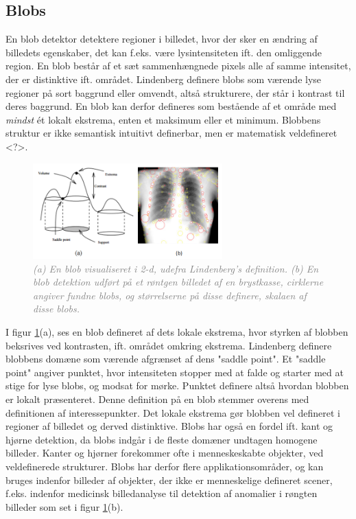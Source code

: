 \subsection{Blobs}
En blob detektor detektere regioner i billedet, hvor der sker en ændring af billedets egenskaber, det kan f.eks. være lysintensiteten ift. den omliggende region. En blob består af et sæt sammenhængnede pixels alle af samme intensitet, der er distinktive ift. området. Lindenberg \cite{blob} definere blobs som værende lyse regioner på sort baggrund eller omvendt, altså strukturere, der står i kontrast til deres baggrund. En blob kan derfor defineres som bestående af et område med \emph{mindst} ét lokalt ekstrema, enten et maksimum eller et minimum. Blobbens struktur er ikke semantisk intuitivt definerbar, men er matematisk veldefineret <?>.
\begin{figure}[H]
    \centering
    \includegraphics[width=0.65\textwidth]{fig/13.png}
    \vspace{-0.5em}   
    \begin{center}
    \caption{\textcolor{gray}{\footnotesize \textit{
    (a) En blob visualiseret i 2-d, udefra Lindenberg's definition. (b) En blob detektion udført på et røntgen billedet af en brystkasse, cirklerne angiver fundne blobs, og størrelserne på disse definere,  skalaen af disse blobs.}}}
    \label{fig:lindblob}
     \end{center}
  \end{figure}
       \vspace{-2.5em}
\noindent
I figur \ref{fig:lindblob}(a), ses en blob defineret af dets lokale ekstrema, hvor styrken af blobben beksrives ved kontrasten, ift. området omkring ekstrema. Lindenberg definere blobbens domæne som værende afgrænset af dens "saddle point". Et "saddle point" angiver punktet, hvor intensiteten stopper med at falde og starter med at stige for lyse blobs, og modsat for mørke. Punktet definere altså hvordan blobben er lokalt præsenteret. Denne definition på en blob stemmer overens med definitionen af interessepunkter. Det lokale ekstrema gør blobben vel defineret i regioner af billedet og derved distinktive. Blobs har også en fordel ift. kant og hjørne detektion, da blobs indgår i de fleste domæner undtagen homogene billeder. Kanter og hjørner forekommer ofte i menneskeskabte objekter, ved veldefinerede strukturer. Blobs har derfor flere applikationsområder, og kan bruges indenfor billeder af objekter, der ikke er menneskelige defineret scener, f.eks. indenfor medicinsk billedanalyse til detektion af anomalier i røngten billeder som set i figur \ref{fig:lindblob}(b). 
